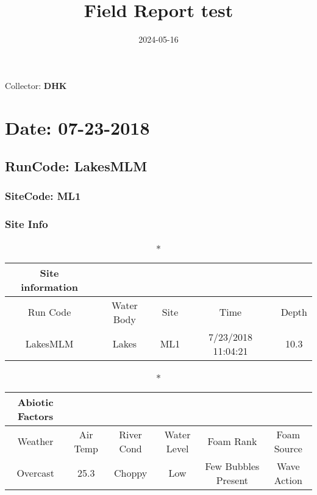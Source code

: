 \documentclass[
  letterpaper,
  DIV=11,
  numbers=noendperiod]{scrartcl}
\title{Field Report test}
\author{}
\date{2024-05-16}
\renewcommand*\contentsname{Table of contents}
\newcommand\contentsname{Table of contents}
\begin{document}
\maketitle
\ifdefined\Shaded\renewenvironment{Shaded}{\begin{tcolorbox}[frame hidden, sharp corners, interior hidden, boxrule=0pt, borderline west={3pt}{0pt}{shadecolor}, breakable, enhanced]}{\end{tcolorbox}}\fi

\renewcommand*\contentsname{Table of contents}
{
\hypersetup{linkcolor=}
\setcounter{tocdepth}{3}
\tableofcontents
}
Collector: \textbf{DHK}

\hypertarget{date-07-23-2018}{%
\section{Date: 07-23-2018}\label{date-07-23-2018}}

\hypertarget{runcode-lakesmlm}{%
\subsection{RunCode: LakesMLM}\label{runcode-lakesmlm}}

\hypertarget{sitecode-ml1}{%
\subsubsection{SiteCode: ML1}\label{sitecode-ml1}}

\subsubsection{Site Info}

\begin{longtable*}{ccccc}
\caption*{
{\large Site information}
} \\ 
\toprule
Run Code & Water Body & Site & Time & Depth \\ 
\midrule\addlinespace[2.5pt]
LakesMLM & Lakes & ML1 & 7/23/2018 11:04:21 & 10.3 \\ 
\bottomrule
\end{longtable*}

\begin{longtable*}{cccccc}
\caption*{
{\large Abiotic Factors}
} \\ 
\toprule
Weather & Air Temp & River Cond & Water Level & Foam Rank & Foam Source \\ 
\midrule\addlinespace[2.5pt]
Overcast & 25.3 & Choppy & Low & Few Bubbles Present & Wave Action \\ 
\bottomrule
\end{longtable*}
\end{document}
